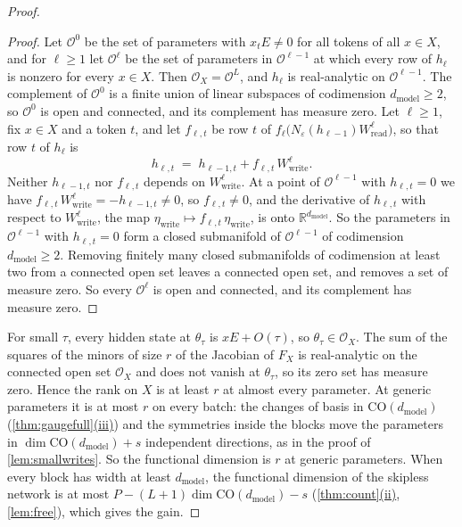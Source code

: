 \documentclass[10pt]{article}
\theoremstyle{definition}
\theoremstyle{remark}
\newcommand{\R}{\mathbb{R}}
\newcommand{\Wread}{W_{\mathrm{read}}}
\newcommand{\Wwrite}{W_{\mathrm{write}}}
\newcommand{\dm}{d_{\mathrm{model}}}
\newcommand{\CO}{\mathrm{CO}}
\DeclareRobustCommand{\cpref}[2]{\hyperref[#1:#2]{\cref*{#1}(#2)}}
\newenvironment{nested}{\par\nopagebreak\def\FrameCommand{\hspace{0.5em}{\color{black!30}\vrule width 0.6pt}\hspace{1em}}\MakeFramed{\advance\hsize-\width\FrameRestore}}{\endMakeFramed}
\begin{document}
\begin{proof}
\begin{nested}
\begin{proof}
Let $\mathcal O^0$ be the set of parameters with $x_tE \neq 0$ for all tokens of all $x \in X$, and for $\ell \ge 1$ let $\mathcal O^\ell$ be the set of parameters in $\mathcal O^{\ell-1}$ at which every row of $h_\ell$ is nonzero for every $x \in X$. Then $\mathcal O_X = \mathcal O^L$, and $h_\ell$ is real-analytic on $\mathcal O^{\ell-1}$. The complement of $\mathcal O^0$ is a finite union of linear subspaces of codimension $\dm \ge 2$, so $\mathcal O^0$ is open and connected, and its complement has measure zero. Let $\ell \ge 1$, fix $x \in X$ and a token $t$, and let $f_{\ell,t}$ be row $t$ of $f_\ell\big(N_\varepsilon(h_{\ell-1})\Wread^{\ell}\big)$, so that row $t$ of $h_\ell$ is
\[
h_{\ell,t} \;=\; h_{\ell-1,t} + f_{\ell,t}\,\Wwrite^{\ell} .
\]
Neither $h_{\ell-1,t}$ nor $f_{\ell,t}$ depends on $\Wwrite^{\ell}$. At a point of $\mathcal O^{\ell-1}$ with $h_{\ell,t} = 0$ we have $f_{\ell,t}\,\Wwrite^{\ell} = -h_{\ell-1,t} \neq 0$, so $f_{\ell,t} \neq 0$, and the derivative of $h_{\ell,t}$ with respect to $\Wwrite^{\ell}$, the map $\eta_{\mathrm{write}} \mapsto f_{\ell,t}\,\eta_{\mathrm{write}}$, is onto $\R^{\dm}$. So the parameters in $\mathcal O^{\ell-1}$ with $h_{\ell,t} = 0$ form a closed submanifold of $\mathcal O^{\ell-1}$ of codimension $\dm \ge 2$. Removing finitely many closed submanifolds of codimension at least two from a connected open set leaves a connected open set, and removes a set of measure zero. So every $\mathcal O^\ell$ is open and connected, and its complement has measure zero.
\end{proof}
\end{nested}
For small $\tau$, every hidden state at $\theta_\tau$ is $xE + O(\tau)$, so $\theta_\tau \in \mathcal O_X$. The sum of the squares of the minors of size $r$ of the Jacobian of $F_X$ is real-analytic on the connected open set $\mathcal O_X$ and does not vanish at $\theta_\tau$, so its zero set has measure zero. Hence the rank on $X$ is at least $r$ at almost every parameter. At generic parameters it is at most $r$ on every batch: the changes of basis in $\CO(\dm)$ (\cpref{thm:gaugefull}{iii}) and the symmetries inside the blocks move the parameters in $\dim\CO(\dm) + s$ independent directions, as in the proof of \cref{lem:smallwrites}. So the functional dimension is $r$ at generic parameters. When every block has width at least $\dm$, the functional dimension of the skipless network is at most $P - (L+1)\dim\CO(\dm) - s$ (\cpref{thm:count}{ii}, \cref{lem:free}), which gives the gain.
\end{proof}
\end{document}
